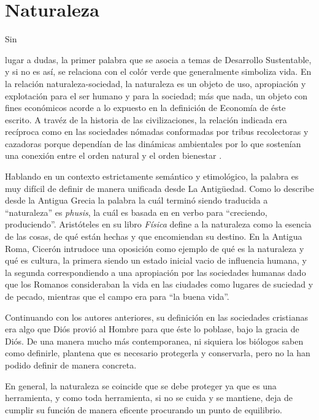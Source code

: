 \documentclass[stu, 12pt, letterpaper, donotrepeattitle, floatsintext, natbib]{apa7}
\begin{document}
\section{Naturaleza}
Sin \begin{justifying}lugar a dudas, la primer palabra que se asocia a temas de Desarrollo Sustentable, y si no es así, se relaciona con el colór verde que generalmente simboliza vida.
En la relación naturaleza-sociedad, la naturaleza es un objeto de uso, apropiación y explotación para el ser humano y para la sociedad; más que nada, un objeto con fines económicos acorde
a lo expuesto en la definición de Economía de éste escrito. A travéz de la historia de las civilizaciones, la relación indicada era recíproca como en las sociedades nómadas
conformadas por tribus recolectoras y cazadoras porque dependían de las dinámicas ambientales por lo que sostenían una conexión entre el orden natural y el orden bienestar \citep{sarmiento-2017}.\par 
\vspace{\baselineskip}
Hablando en un contexto estrictamente semántico y etimológico, la palabra es muy difícil de definir de manera unificada desde La Antigüedad. Como lo describe
\cite{ducarme-2020}
desde la Antigua Grecia la palabra la cuál terminó siendo traducida a ``naturaleza'' es \emph{phusis}, la cuál es basada en en verbo para ``creciendo, produciendo''. Aristóteles
en su libro \emph{Física} define a la naturaleza como la esencia de las cosas, de qué están hechas y que encomiendan su destino. En la Antigua Roma, Cicerón intrudoce una oposición como ejemplo de
qué es la naturaleza y qué es cultura, la primera siendo un estado inicial vacio de influencia humana, y la segunda correspondiendo a una apropiación por las sociedades humanas dado que los Romanos
consideraban la vida en las ciudades como lugares de suciedad y de pecado, mientras que el campo era para ``la buena vida''.\par
\vspace{\baselineskip}
Continuando con los autores anteriores, su definición en las sociedades cristianas era algo que Diós provió al Hombre para que éste lo poblase, bajo la gracia de Diós. De una manera mucho más
contemporanea, ni siquiera los biólogos saben como definirle, plantena que es necesario protegerla y conservarla, pero no la han podido definir de manera concreta.\par
\vspace{\baselineskip}
En general, la naturaleza se coincide que se debe proteger ya que es una herramienta, y como toda herramienta, si no se cuida y se mantiene, deja de cumplir su función de manera eficente procurando
un punto de equilibrio.\par\end{justifying}
\vspace{\baselineskip}
\end{document}
